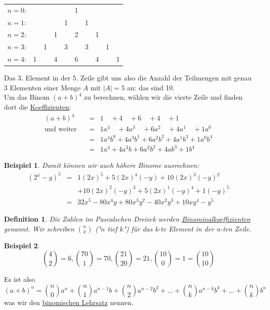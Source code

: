 \documentclass{report}
\newtheorem{mydef}{Definition}
\newtheorem{myexample}{Beispiel}
\begin{document}
\begin{center}
\begin{tabular}{rccccccccc}
$n=0$: & & & & & 1 & & & & \\
$n=1$: & & & & 1 & & 1 & & & \\
$n=2$: & & & 1 & & 2 & & 1 & & \\
$n=3$: & & 1 & & 3 & & 3 & & 1 & \\
$n=4$: & 1 & & 4 & & 6 & & 4 & & 1%
\end{tabular}
\end{center}
Das 3. Element in der 5. Zeile gibt uns also die Anzahl der Teilmengen mit genau 3 Elementen einer Menge $A$ mit $|A| = 5$ an: das sind 10.\\
Um das Binom $(a+b)^4$ zu berechnen, wählen wir die vierte Zeile und finden dort die \underline{Koeffizienten}:
\begin{eqnarray}(a+b)^4 & = & 1\quad +4 \quad +6 \quad +4 \quad +1 \\ \nonumber
\mbox{und weiter} \quad & = & 1a^4 \quad +4a^3 \quad +6a^2 \quad +4a^1 \quad +1a^0 \\ \nonumber
& = & 1a^4b^0 + 4a^3b^1 + 6a^2b^2 + 4a^1b^3 + 1a^0b^4 \\ \nonumber
& = & 1a^4 + 4a^3b + 6a^2b^2 + 4ab^3 + 1b^4\end{eqnarray}
\begin{myexample}Damit können wir auch höhere Binome ausrechnen:
\begin{eqnarray}(2^x-y)^5 & = & 1(2x)^5 + 5(2x)^4(-y) + 10(2x)^3(-y)^2\\
& & + 10(2x)^2(-y)^3 + 5(2x)^1(-y)^4 + 1(-y)^5 \nonumber \\
& = & 32x^5-80x^4y + 80x^3y^2-40x^2y^3+10xy^4 -y^5\end{eqnarray}\end{myexample}
\begin{mydef}Die Zahlen im Pascalschen Dreieck werden \underline{Binominalkoeffizienten} genannt. Wir schreiben $\binom{n}{k}$ ("$n$ tief $k$") für das k-te Element in der n-ten Zeile.\end{mydef}
\begin{myexample}\begin{equation}\binom{4}{2} = 6, \binom{70}{1} = 70, \binom{21}{20} = 21, \binom{10}{0} = 1 = \binom{10}{10}\end{equation}\end{myexample}
Es ist also
\begin{equation}(a+b)^n = \binom{n}{0}a^n + \binom{n}{1}a^{n-1}b + \binom{n}{2}a^{n-2}b^2 + ... + \binom{n}{k}a^{n-k}b^k + ... + \binom{n}{k}b^n\end{equation}
was wir den \underline{binomischen Lehrsatz} nennen.
\end{document}
